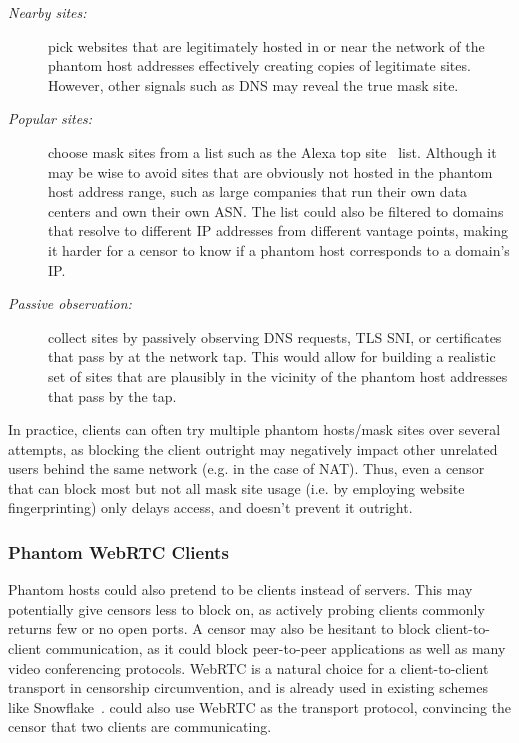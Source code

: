 \documentclass[sigconf]{acmart}
\begin{document}
\begin{description}
\item[\rm\em Nearby sites:] pick websites that are
legitimately hosted in or near the network of the phantom host addresses
effectively creating copies of legitimate sites. However, other signals such as 
DNS may reveal the true mask site.

\item[\rm\em Popular sites:] choose mask sites from a list such as the Alexa
top site~\cite{alexa-top500} list. Although it may be wise to avoid
sites that are obviously not hosted in the phantom host address range, such as
large companies that run their own data centers and own their own ASN.
The list could also be filtered to domains that resolve to different IP
addresses from different vantage points, making it harder for a censor to know
if a phantom host corresponds to a domain's IP.

\item[\rm\em Passive observation:] collect sites by passively observing DNS requests, TLS
SNI, or certificates that pass by at the network tap. This would allow for building a realistic set
of sites that are plausibly in the vicinity of the phantom host addresses
that pass by the tap. 

\end{description}

In practice, clients can often try multiple phantom hosts/mask sites over
several attempts, as blocking the client outright may negatively impact other
unrelated users behind the same network (e.g. in the case of NAT). Thus, even a
censor that can block most but not all mask site usage (i.e. by employing 
website fingerprinting) only delays access, and doesn't prevent it outright.

\subsubsection{Phantom WebRTC Clients}
\label{sec:webrtc}

Phantom hosts could also pretend to be clients instead of servers. This may
potentially give censors less to block on, as actively probing clients commonly
returns few or no open ports. A censor may also be hesitant to block
client-to-client communication, as it could block peer-to-peer applications as
well as many video conferencing protocols. WebRTC is a
natural choice for a client-to-client transport in censorship circumvention,
and is already used in existing schemes like
Snowflake~\cite{snowflake}. \scheme could also use WebRTC as the
transport protocol, convincing the censor that two clients are communicating.
\end{document}
